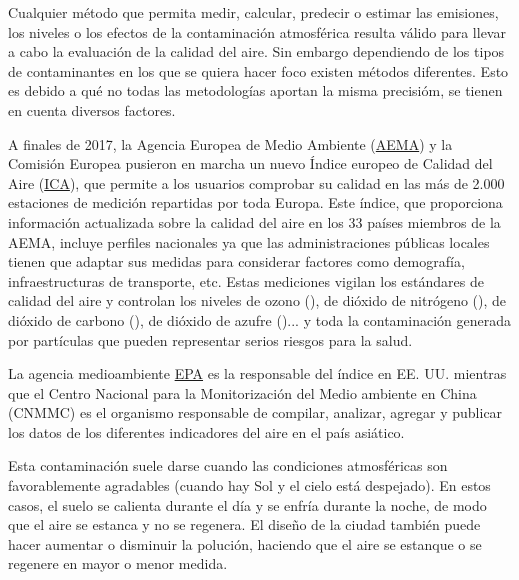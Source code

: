  Cualquier método que permita medir, calcular, predecir o estimar las emisiones, los niveles o los efectos de la contaminación atmosférica resulta válido para llevar a cabo la evaluación de la calidad del aire. Sin embargo dependiendo de los tipos de contaminantes en los que se quiera hacer foco existen métodos diferentes. Esto es debido a qué no todas las metodologías aportan la misma precisióm, se tienen en cuenta diversos factores.
 
   A finales de 2017, la Agencia Europea de Medio Ambiente (\href{https://www.eea.europa.eu/}{AEMA}) y la Comisión Europea pusieron en marcha un nuevo Índice europeo de Calidad del Aire (\href{https://www.eltiempo.es/calidad-aire}{ICA}), que permite a los usuarios comprobar su calidad en las más de 2.000 estaciones de medición repartidas por toda Europa. Este índice, que proporciona información actualizada sobre la calidad del aire en los 33 países miembros de la AEMA, incluye perfiles nacionales ya que las administraciones públicas locales tienen que adaptar sus medidas para considerar factores como demografía, infraestructuras de transporte, etc. Estas mediciones vigilan los estándares de calidad del aire y controlan los niveles de ozono (), de dióxido de nitrógeno (), de dióxido de carbono (), de dióxido de azufre ()... y toda la contaminación generada por partículas que pueden representar serios riesgos para la salud.
      
  La agencia medioambiente \href{https://www.epa.gov}{EPA} es la responsable del índice en EE. UU. mientras que el Centro Nacional para la Monitorización del Medio ambiente en China (CNMMC) es el organismo responsable de compilar, analizar, agregar y publicar los datos de los diferentes indicadores del aire en el país asiático.
  
   
   Esta contaminación suele darse  cuando las condiciones atmosféricas son favorablemente agradables (cuando hay Sol y el cielo está despejado). En estos casos, el suelo se calienta durante el día y se enfría durante la noche, de modo que el aire se estanca y no se regenera. El diseño de la ciudad también puede hacer aumentar o disminuir la polución, haciendo que el aire se estanque o se regenere en mayor o menor medida.
   
